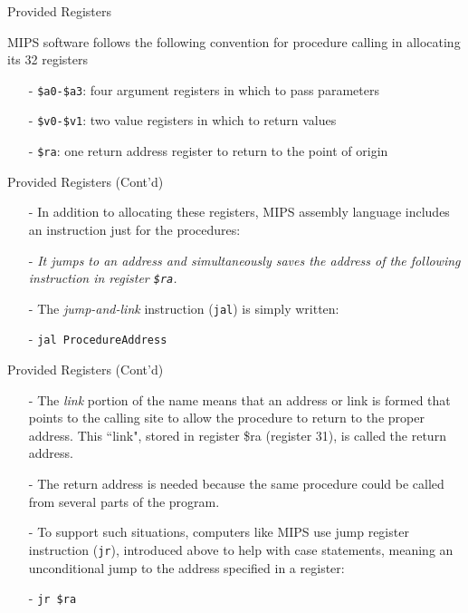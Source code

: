 \begin{frame}{Provided Registers}
\begin{flushleft}
MIPS software follows the following convention for procedure calling in allocating its 32 registers
\end{flushleft}

\begin{itemize}
\item[-]
\texttt{\$a0-\$a3}: four argument registers in which to pass parameters
\item[-] \texttt{\$v0-\$v1}: two value registers in which to return values
\item[-] \texttt{\$ra}: one return address register to return to the point of origin    
\end{itemize}
\end{frame}

\begin{frame}{Provided Registers (Cont'd)}
\begin{itemize}
\item[-] In addition to allocating these registers, MIPS assembly language includes an instruction just for the procedures: 

\item[-]\textit{It jumps to an address and simultaneously saves the address of the following instruction in register \texttt{\$ra}.} 

\item[-]The \textit{jump-and-link} instruction (\texttt{jal}) is simply written:

\item[-] \texttt{jal ProcedureAddress}
\end{itemize}
\end{frame}

\begin{frame}{Provided Registers (Cont'd)}
\begin{itemize}
\item[-] 
The \textit{link} portion of the name means that an address or link is formed that points to
the calling site to allow the procedure to return to the proper address. This ``link",
stored in register \$ra (register 31), is called the return address. 

\item[-] The return address
is needed because the same procedure could be called from several parts of the
program.

\item[-]To support such situations, computers like MIPS use jump register instruction
(\texttt{jr}), introduced above to help with case statements, meaning an unconditional
jump to the address specified in a register:

\item[-] \texttt{jr \$ra}
\end{itemize}
\end{frame}

